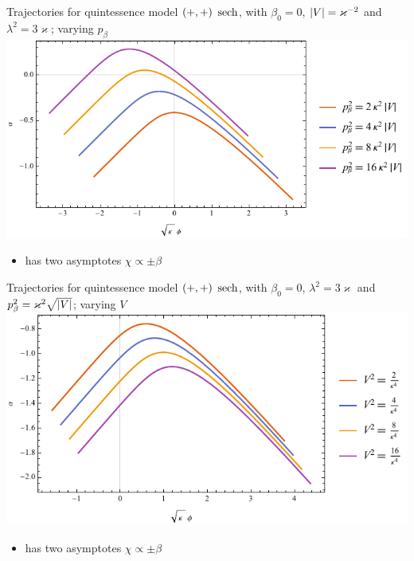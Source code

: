 \documentclass[8pt]{beamer}
\begin{document}
\begin{frame}%
{Trajectories for quintessence model ${\left(+,+\right)}$}%
{$\operatorname{sech}$, with $\beta_0 = 0$, ${\left|V\right|} = \varkappa^{-2}$ and
$\lambda^2 = 3\varkappa$; varying $p_\beta$}
\includegraphics[width=\textwidth]{../plots.nb/sech_pbet.pdf}
\begin{itemize}
	\item has two asymptotes $\chi \propto \pm \beta$
\end{itemize}
\end{frame}

\begin{frame}%
{Trajectories for quintessence model ${\left(+,+\right)}$}%
{$\operatorname{sech}$, with $\beta_0 = 0$, $\lambda^2 = 3\varkappa$ and
$p_\beta^2 = \varkappa^2\sqrt{{\left|V\right|}}$; varying $V$}
\includegraphics[width=\textwidth]{../plots.nb/sech_Vsqr.pdf}
\begin{itemize}
	\item has two asymptotes $\chi \propto \pm \beta$
\end{itemize}
\end{frame}

\end{document}
